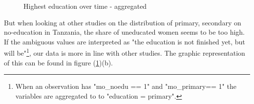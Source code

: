 \documentclass[a4paper, 11pt]{article} %
\begin{document}
\begin{figure}[h!]
    \centering
    \qquad
    \caption{Highest education over time - aggregated}%
    \label{fig:education_proportion}%
\end{figure}

But when looking at other studies \cite{SAM08} on the distribution of primary, secondary on no-education in Tanzania, the share of uneducated women seems to be too high. If the ambiguous values are interpreted as "the education is not finished yet, but will be"\footnote{When an observation has "mo\_noedu == 1" and "mo\_primary== 1" the variables are aggregated to  to "education = primary".}, our data is more in line with other studies. The graphic representation of this can be found in figure (\ref{fig:education_proportion})(b).  
\end{document}
